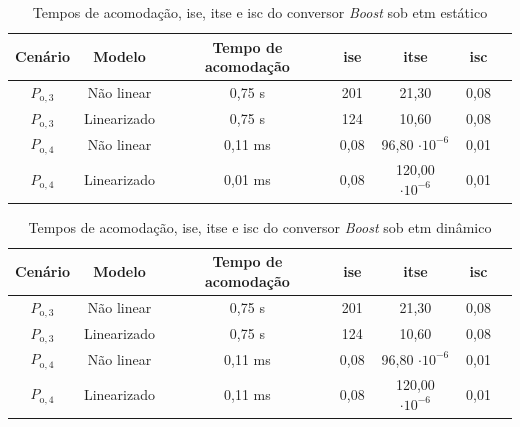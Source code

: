 \vspace{8pt}
\begin{table}[H]
  \centering
  \setlength{\tabcolsep}{10pt}
  \begin{tabular}{ccccccc}
    \toprule
    Cenário & Modelo      & Tempo de acomodação & \acrshort{ise} & \acrshort{itse}        & \acrshort{isc} \\
    \midrule
    $P_{\mathrm{o}, 3}$       & Não linear  & 0,75 s              & 201            & 21,30                  & 0,08           \\
    $P_{\mathrm{o}, 3}$       & Linearizado & 0,75 s              & 124            & 10,60                  & 0,08           \\
    $P_{\mathrm{o}, 4}$       & Não linear  & 0,11 ms             & 0,08           & 96,80 $\cdot 10^{-6}$  & 0,01           \\
    $P_{\mathrm{o}, 4}$       & Linearizado & 0,01 ms             & 0,08           & 120,00 $\cdot 10^{-6}$ & 0,01           \\
    \bottomrule
  \end{tabular}
  \caption{Tempos de acomodação, \acrshort{ise}, \acrshort{itse} e \acrshort{isc} do conversor \textit{Boost} sob \acrshort{etm} estático}
  \label{table:indices_desempenho_etm_estático_boost}
\end{table}

\vspace{8pt}
\begin{table}[H]
  \centering
  \setlength{\tabcolsep}{10pt}
  \begin{tabular}{ccccccc}
    \toprule
    Cenário & Modelo      & Tempo de acomodação & \acrshort{ise} & \acrshort{itse}        & \acrshort{isc} \\
    \midrule
    $P_{\mathrm{o}, 3}$       & Não linear  & 0,75 s              & 201            & 21,30                  & 0,08           \\
    $P_{\mathrm{o}, 3}$       & Linearizado & 0,75 s              & 124            & 10,60                  & 0,08           \\
    $P_{\mathrm{o}, 4}$       & Não linear  & 0,11 ms             & 0,08           & 96,80 $\cdot 10^{-6}$  & 0,01           \\
    $P_{\mathrm{o}, 4}$       & Linearizado & 0,11 ms             & 0,08           & 120,00 $\cdot 10^{-6}$ & 0,01           \\
    \bottomrule
  \end{tabular}
  \caption{Tempos de acomodação, \acrshort{ise}, \acrshort{itse} e \acrshort{isc} do conversor \textit{Boost} sob \acrshort{etm} dinâmico}
  \label{table:indices_desempenho_etm_dinamico_boost}
\end{table}
